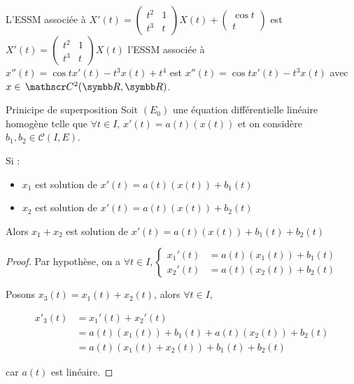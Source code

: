 \begin{exemple}
    L'ESSM associée à 
    $X'(t) = \begin{pmatrix}
        t^2 & 1 \\
        t^3 & t
     \end{pmatrix} X(t) + \begin{pmatrix}
        \cos t \\ t
    \end{pmatrix}$ est $X'(t) = \begin{pmatrix}
        t^2 & 1 \\
        t^3 & t
     \end{pmatrix} X(t)$ l'ESSM 
     associée à $x''(t) = \cos t x'(t) - t^3 x(t) + t^4$ est 
     $x''(t) = \cos t x'(t) - t^3 x(t)$ avec $x \in \mc 2 (\R, \R)$. 
\end{exemple}

\begin{proposition}{Prinicipe de superposition}{}
    Soit $(E_0)$ une équation différentielle linéaire homogène telle que 
    $\forall t \in I$, $x'(t) = a(t)(x(t))$ et on considère 
    $b_1, b_2 \in \mathscr C(I, E)$. 

    Si : 
    \begin{itemize}
        \item $x_1$ est solution de $x'(t) = a(t)(x(t)) + b_1(t)$
        \item $x_2$ est solution de $x'(t) = a(t)(x(t)) + b_2(t)$
    \end{itemize}
    Alors $x_1 + x_2$ est solution de $x'(t) = a(t)(x(t)) + b_1(t) + b_2(t)$
\end{proposition}

\begin{proof}
    Par hypothèse, on a 
    $\forall t \in I, 
\begin{cases}
    x_1'(t) & = a(t)(x_1(t)) + b_1(t) \\
    x_2'(t) & = a(t)(x_2(t)) + b_2(t)
\end{cases}$

    Posons $x_3(t) = x_1(t) + x_2(t)$, alors $\forall t \in I$, 

    \begin{align}
        x'_3(t) & = x_1'(t) + x_2'(t) \\
        & = a(t)(x_1(t)) + b_1(t) + a(t)(x_2(t)) + b_2(t) \\
        & = a(t)(x_1(t) + x_2(t)) + b_1(t) + b_2(t) 
    \end{align}

    car $a(t)$ est linéaire.
\end{proof}

